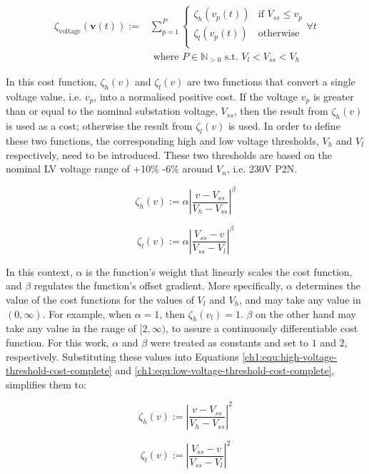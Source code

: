\begin{equation}
\begin{split}
	\zeta_\text{voltage}(\textbf{v}(t)) :=& \sum_{p=1}^{P}{\begin{cases}
		\zeta_h(v_{p}(t)) & \text{if } V_{ss} \leq v_p\\
		\zeta_l(v_{p}(t)) & \text{otherwise}\\
	\end{cases}} \forall t\\
	&\text{ where } P \in \mathbb{N}_{>0} \text{ s.t. } V_l < V_{ss} < V_h
\end{split}
\label{ch1:equ:voltage-deviation}
\end{equation}

In this cost function, $\zeta_h(v)$ and $\zeta_l(v)$ are two functions that convert a single voltage value, i.e. $v_p$, into a normalised positive cost.
If the voltage $v_p$ is greater than or equal to the nominal substation voltage, $V_{ss}$, then the result from $\zeta_h(v)$ is used as a cost; otherwise the result from $\zeta_l(v)$ is used.
In order to define these two functions, the corresponding high and low voltage thresholds, $V_h$ and $V_l$ respectively, need to be introduced.
These two thresholds are based on the nominal LV voltage range of +10\% -6\% around $V_n$, i.e. 230V P2N.

\begin{equation}
	\zeta_h(v) := \alpha \left|\frac{v-V_{ss}}{V_h-V_{ss}}\right|^{\beta}
	\label{ch1:equ:high-voltage-threshold-cost-complete}
\end{equation}

\begin{equation}
	\zeta_l(v) := \alpha \left|\frac{V_{ss}-v}{V_{ss}-V_l}\right|^{\beta}
	\label{ch1:equ:low-voltage-threshold-cost-complete}
\end{equation}

In this context, $\alpha$ is the function's weight that linearly scales the cost function, and $\beta$ regulates the function's offset gradient.
More specifically, $\alpha$ determines the value of the cost functions for the values of $V_l$ and $V_h$, and may take any value in $(0, \infty)$.
For example, when $\alpha = 1$, then $\zeta_{h}(v_l) = 1$.
$\beta$ on the other hand may take any value in the range of $[2, \infty)$, to assure a continuously differentiable cost function.
For this work, $\alpha$ and $\beta$ were treated as constants and set to $1$ and $2$, respectively.
Substituting these values into Equations \ref{ch1:equ:high-voltage-threshold-cost-complete} and \ref{ch1:equ:low-voltage-threshold-cost-complete}, simplifies them to:

\begin{equation}
	\zeta_h(v) := \left|\frac{v-V_{ss}}{V_h-V_{ss}}\right|^{2}
	\label{ch1:equ:high-voltage-threshold-cost-simple}
\end{equation}

\begin{equation}
	\zeta_l(v) := \left|\frac{V_{ss}-v}{V_{ss}-V_l}\right|^{2}
	\label{ch1:equ:low-voltage-threshold-cost-simple}
\end{equation}
